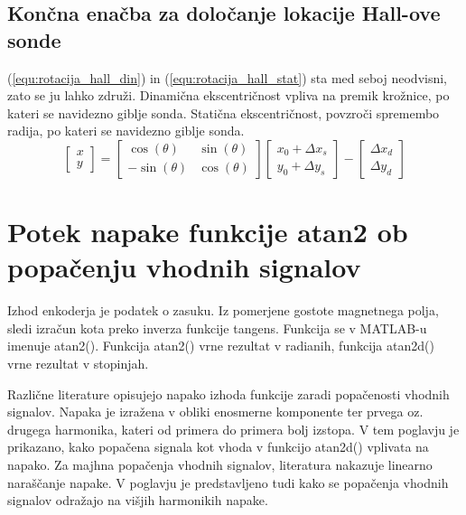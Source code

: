 \section{Končna enačba za določanje lokacije Hall-ove sonde}
(\ref{equ:rotacija_hall_din}) in (\ref{equ:rotacija_hall_stat}) sta med seboj neodvisni, zato se ju lahko združi. 
Dinamična ekscentričnost vpliva na premik krožnice, po kateri se navidezno giblje sonda. Statična ekscentričnost, povzroči spremembo radija, po kateri se navidezno giblje sonda.
\begin{equation}
\label{equ:rotacija_hall_koncna}
\begin{bmatrix} x\\y \end{bmatrix}=
\begin{bmatrix} \cos(\theta)&\sin(\theta)\\-\sin(\theta)&\cos(\theta) \end{bmatrix}
\begin{bmatrix} x_0+\Delta x_s\\y_0+\Delta y_s \end{bmatrix}-
\begin{bmatrix} \Delta x_d\\\Delta y_d \end{bmatrix}
\end{equation}
%
%
\chapter{Potek napake funkcije atan2 ob popačenju vhodnih signalov}
Izhod enkoderja je podatek o zasuku. Iz pomerjene gostote magnetnega polja, sledi izračun kota preko inverza funkcije tangens. Funkcija se v MATLAB-u imenuje atan2(). Funkcija atan2() vrne rezultat v radianih,
funkcija atan2d() vrne rezultat v stopinjah\cite{atan2Matlab}\cite{atan2dMatlab}.

Različne literature \cite{RLS3} \cite{osnova} \cite{RLS1} \cite{RLS2} opisujejo napako izhoda funkcije zaradi popačenosti vhodnih signalov. Napaka je izražena v obliki enosmerne komponente ter prvega oz. drugega
harmonika, kateri od primera do primera bolj izstopa. V tem poglavju je prikazano, kako popačena signala kot vhoda v funkcijo atan2d() vplivata na napako. Za majhna popačenja vhodnih signalov, literatura nakazuje linearno naraščanje napake. V poglavju je predstavljeno tudi kako se popačenja vhodnih signalov odražajo na višjih harmonikih napake.
